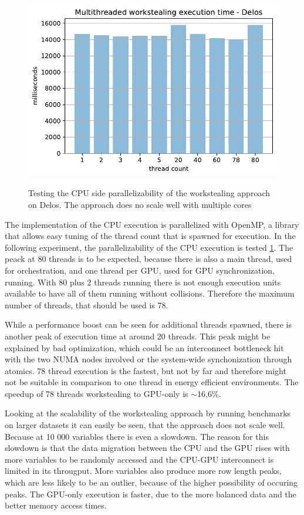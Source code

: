 \begin{figure}[h]
  \caption{Testing the CPU side parallelizability of the workstealing approach on Delos. The approach does no scale well with multiple cores}
  \includegraphics[width=\textwidth]{figures/threaded_wsteal.pdf}
  \centering
  \label{fig:wstealing_threaded_delos}
\end{figure}

The implementation of the CPU execution is parallelized with OpenMP, a library that allows easy tuning of the thread count that is spawned for execution. In the following experiment, the parallelizability of the CPU execution is tested \ref{fig:wstealing_threaded_delos}.
The peack at 80 threads is to be expected, because there is also a main thread, used for orchestration, and one thread per GPU, used for GPU synchronization, running. With 80 plus 2 threads running there is not enough execution units available to have all of them running without collisions. Therefore the maximum number of threads, that should be used is 78.

While a performance boost can be seen for additional threads spawned, there is another peak of execution time at around 20 threads. This peak might be explained by bad optimization, which could be an interconnect bottleneck hit with the two NUMA nodes involved or the system-wide synchonization through atomics. 78 thread execution is the fastest, but not by far and therefore might not be suitable in comparison to one thread in energy efficient environments. The speedup of 78 threads workstealing to GPU-only is $\sim$16,6\%.



Looking at the scalability of the workstealing approach by running benchmarks on larger datasets it can easily be seen, that the approach does not scale well. Because at 10 000 variables there is even a slowdown. The reason for this slowdown is that the data migration between the CPU and the GPU rises with more variables to be randomly accessed and the CPU-GPU interconnect is limited in its througput. More variables also produce more row length peaks, which are less likely to be an outlier, because of the higher possibility of occuring peaks.
The GPU-only execution is faster, due to the more balanced data and the better memory access times.

